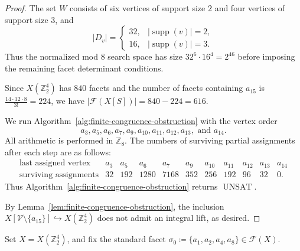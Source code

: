 \documentclass{amsart}
\newcommand{\Z}{\mathbb{Z}}
\newcommand{\cF}{\mathcal{F}}
\newcommand{\cV}{\mathcal{V}}
\DeclareMathOperator{\UNSAT}{UNSAT}
\DeclareMathOperator{\supp}{supp}
\theoremstyle{definition}
\theoremstyle{remark}
\begin{document}
\begin{proof}
    The set $W$ consists of six vertices of support size $2$ and four vertices of support size $3$, and
    $$
        |D_v|= \begin{cases}
            32, & |\supp(v)|=2,\\
            16, & |\supp(v)|=3.
        \end{cases}
    $$
    Thus the normalized mod $8$ search space has size $32^6\cdot16^4=2^{46}$ before imposing the remaining facet determinant conditions.
    
    Since $X(\Z_2^4)$ has $840$ facets and the number of facets containing $a_{15}$ is $\frac{14\cdot12\cdot8}{3!}=224$, we have $|\cF(X[S])|=840-224=616$.
    
    We run Algorithm~\ref{alg:finite-congruence-obstruction} with the vertex order
    $$
        a_3, a_5, a_6, a_7, a_9, a_{10}, a_{11}, a_{12}, a_{13},\text{ and } a_{14}.
    $$
    All arithmetic is performed in $\Z_8$. 
    The numbers of surviving partial assignments after each step are as follows:
    $$
        \begin{array}{c|cccccccccc}
            \text{last assigned vertex} & a_3 & a_5 & a_6 & a_7 & a_9 & a_{10} & a_{11} & a_{12} & a_{13} & a_{14} \\ \hline
            \text{surviving assignments} & 32 & 192 & 1280 & 7168 & 352 & 256 & 192 & 96 & 32 & 0 .
        \end{array}
    $$
    Thus Algorithm~\ref{alg:finite-congruence-obstruction} returns $\UNSAT$.
    
    By Lemma~\ref{lem:finite-congruence-obstruction}, the inclusion~$X[\cV\setminus\{a_{15}\}] \hookrightarrow X(\Z_2^4)$ does not admit an integral lift, as desired.
\end{proof}

Set $X = X(\Z_2^4)$, and fix the standard facet $\sigma_0\coloneq\{a_1,a_2,a_4,a_8\}\in \cF(X)$.
\end{document}
